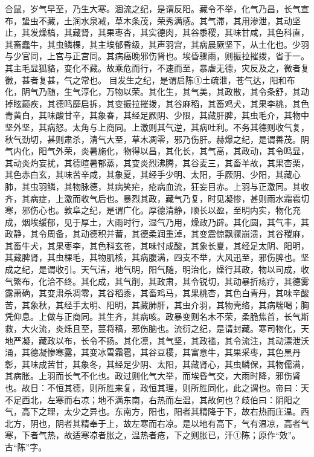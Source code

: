 \documentclass[a4paper,12pt,UTF8,twoside]{ctexbook}
\begin{document}
合鼠，岁气早至，乃生大寒。涸流之纪，是谓反阳。藏令不举，化气乃昌，长气宣布，蛰虫不藏，土润水泉减，草木条茂，荣秀满感。其气滞，其用渗泄，其动坚止，其发燥槁，其藏肾，其果枣杏，其实德肉，其谷黍稷，其味甘咸，其色科直，其畜蠢牛，其虫鳞棵，其主埃郁昏级，其声羽宫，其病晨厥坚下，从土化也。少羽与少官同，上宫与正宫同。其病癌晚邪伤肾也。埃昏骤雨，则振拉摧拨，省于一。其主毛显狐貉，变化不藏。故乘危而行，不速而至，暴虐无德，灾反及之，微者复徽，甚者复甚，气之常也。
目发生之纪，是谓启陈①土疏泄，苍气达，阳和布化，阴气乃随，生气淳化，万物以荣。其化生，其气美，其政散，其令条舒，其动掉眩巅疾，其德鸣靡启拆，其变振拉摧拨，其谷麻稻，其畜鸡犬，其果李桃，其色青黄白，其味酸甘辛，其象春，其经足厥阴、少限，其藏肝脾，其虫毛介，其物中坚外坚，其病怒。太角与上商同。上激则其气逆，其病吐利。不务其德则收气复，秋气劲切，甚则肃杀，清气大至，草木凋零，邪乃伤肝。赫爆之纪，是谓善茂。阴气内化，阳气外荣，炎暑施化，物得以昌，其化长，其气高，其政动，其令鸣显，其动炎灼妄扰，其德暄暑郁蒸，其变炎烈沸腾，其谷麦三，其畜羊故，其果杏栗，其色赤白玄，其味苦辛咸，其象夏，其经手少明、太阳，手厥阴、少阳，其藏心肺，其虫羽鳞，其物脉德，其病笑疟，疮病血流，狂妄目赤。上羽与正激同。其收齐，其病症，上激而收气后也。暴烈其政，藏气乃复，时见凝惨，甚则雨水霜雹切寒，邪伤心也。敦阜之纪，是谓广化。厚德清静，顺长以盈，至明内实，物化充成，烟埃缓郁，见于厚土，大雨时行，湿气乃用，燥政乃辟。其化圆，其气丰，其政静，其令周备，其动德积并蓄，其德柔润重淖，其变震惊飘骤崩溃，其谷稷麻，其畜牛犬，其果枣李，其色科玄苍，其味忖成酸，其象长夏，其经足太阴、阳明，其藏脾肾，其虫棵毛，其物肌核，其病腹满，四支不举，大风迅至，邪伤脾也。坚成之纪，是谓收引。天气洁，地气明，阳气随，明治化，燥行其政，物以司成，收气繁布，化洽不终。其化成，其气削，其政肃，其令锐切，其动暴折疡疗，其德雾露萧确，其变肃杀凋零，其谷稻黍，其畜鸡马，其果桃杏，其色白青丹，其味辛酸苦，其象秋，其经手太明、阳明，其藏肺肝，其虫介羽，其物壳络，其病喘喝；胸凭仰息。上做与正商同。其生齐，其病咳。政暴变则名木不荣，柔脆焦首，长气斯救，大火流，炎烁且至，蔓将稿，邪伤脑也。流衍之纪，是请封藏。寒司物化，天地严凝，藏政以布，长令不扬。其化凛，其气坚，其政褴，其令流注，其动漂泄沃涌，其德凝惨寒露，其变冰雪霜雹，其谷豆稷，其富意牛，其果采枣，其色黑丹彰，其味成苦甘，其象冬，其经足少阴、太阳，其藏肾心，其虫鳞保，其物儒满，其病胀。上羽而长气不化也。政过则化气大举，而埃昏气交，大雨时降，邪伤肾也。故日：不恒其德，则所胜来复，政恒其理，则所胜同化，此之谓也。帝曰：天不足西北，左寒而右凉；地不满东南，右热而左温，其故何也？歧伯曰：阴阳之气，高下之理，太少之异也。东南方，阳也，阳者其精降于下，故右热而庄温。西北方，阴也，阴者其精奉于上，故左寒而右凉。是以地有高下，气有温凉，高者气寒，下者气热，故适寒凉者胀之，温热者疮，下之则胀已，汗①陈；原作“效”。古“陈”字。
\end{document}
